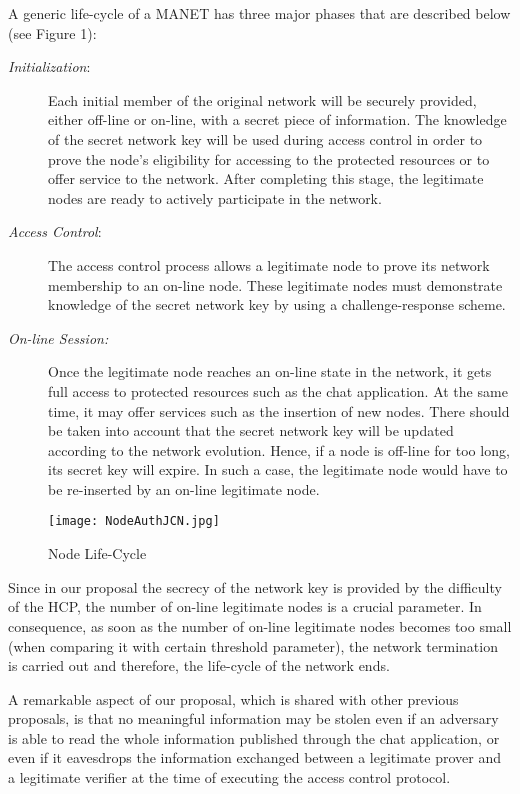 \documentclass{article}
\begin{document}
A generic life-cycle of a MANET has three major phases that are
described below (see Figure 1):
\begin{description}
    \item [\emph{Initialization}:]   Each initial member of the original network will be securely provided,
either off-line or on-line, with a secret piece of information. The knowledge of the secret network key will be used during access
control in order to prove the node's eligibility for accessing to the protected resources or to offer service to the network. After completing this stage, the legitimate nodes are ready to actively participate in the network.
    \item [\emph{Access Control}:] The access control process allows a legitimate node to prove its network membership to an on-line node. These legitimate nodes must demonstrate knowledge of the secret network key by using a challenge-response scheme.
    \item [\emph{On-line Session:}] Once the legitimate node reaches an on-line state in the network, it gets full access to  protected resources such as the chat application. At the same time, it may offer services such as the insertion of new nodes. There should be taken into account that the secret network key will be updated according to the network evolution. Hence, if a node is off-line for too long, its secret key will expire. In such a case, the legitimate node would have to be re-inserted by an on-line legitimate node.

\end{description}
\begin{figure*}\centering
     \texttt{[image: NodeAuthJCN.jpg]} \caption{Node Life-Cycle}
   \label{fig2}
\end{figure*}

Since in our proposal the secrecy of the network key is provided
by the difficulty of the HCP, the number of on-line legitimate
nodes is a crucial parameter. In consequence, as soon as the
number of on-line legitimate nodes becomes too small (when
comparing it with certain threshold parameter), the network
termination is carried out and therefore, the life-cycle of the
network ends.


A remarkable aspect of our proposal, which is shared with other previous proposals, is that no meaningful information may be stolen even if an adversary is able to read the whole information published through the chat application, or even if it eavesdrops the information exchanged between a legitimate prover and a legitimate verifier at the time of executing the access control protocol.
\end{document}
